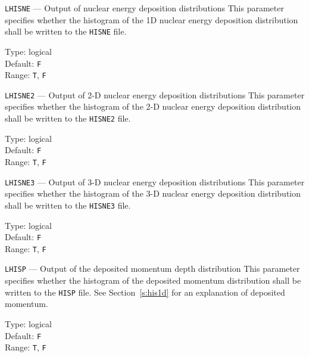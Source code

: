 \begin{keydescription}{\texttt{LHISNE} --- Output of nuclear energy deposition distributions}
%
  This parameter specifies whether the histogram of the 1D nuclear energy
  deposition distribution shall be written to the \texttt{HISNE} file.
  \begin{keytab}
    Type:    \> logical \\
    Default: \> \texttt{F} \\
    Range:   \> \texttt{T}, \texttt{F} 
  \end{keytab}
\end{keydescription}

\begin{keydescription}{\texttt{LHISNE2} --- Output of 2-D nuclear energy deposition distributions}
%
  This parameter specifies whether the histogram of the 2-D nuclear energy
  deposition distribution shall be written to the \texttt{HISNE2} file.
  \begin{keytab}
    Type:    \> logical \\
    Default: \> \texttt{F} \\
    Range:   \> \texttt{T}, \texttt{F} 
  \end{keytab}
\end{keydescription}

\begin{keydescription}{\texttt{LHISNE3} --- Output of 3-D nuclear energy deposition distributions}
%
  This parameter specifies whether the histogram of the 3-D nuclear energy
  deposition distribution shall be written to the \texttt{HISNE3} file.
  \begin{keytab}
    Type:    \> logical \\
    Default: \> \texttt{F} \\
    Range:   \> \texttt{T}, \texttt{F} 
  \end{keytab}
\end{keydescription}

\begin{keydescription}{\texttt{LHISP} --- Output of the deposited momentum depth distribution}
%
  This parameter specifies whether the histogram of the deposited momentum distribution shall 
  be written to the \texttt{HISP} file. See Section~\ref{s:his1d} for an explanation of 
  deposited momentum. 
  \begin{keytab}
    Type:    \> logical \\
    Default: \> \texttt{F} \\
    Range:   \> \texttt{T}, \texttt{F} 
  \end{keytab}
\end{keydescription}


